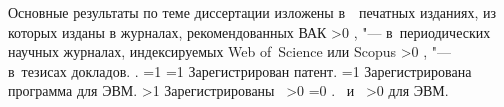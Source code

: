{\begin{refsection}
        \nocite{*}%
        {\publications} Основные результаты по теме диссертации изложены в~~печатных изданиях,
         из которых изданы в журналах, рекомендованных ВАК\sloppy%
        \ifnum \value{citeauthorscopuswos}>0%
            ,  "--- в~периодических научных журналах, индексируемых Web of~Science или Scopus\sloppy%
        \fi%
        \ifnum \value{citeauthorconf}>0%
            ,  "--- в~тезисах докладов.
        \else%
            .
        \fi%
        \ifnum \value{citeregistered}=1%
            \ifnum \value{citeauthorpatent}=1%
                Зарегистрирован  патент.
            \fi%
            \ifnum \value{citeauthorprogram}=1%
                Зарегистрирована  программа для ЭВМ.
            \fi%
        \fi%
        \ifnum \value{citeregistered}>1%
            Зарегистрированы\ %
            \ifnum \value{citeauthorpatent}>0%
            \sloppy%
            \ifnum \value{citeauthorprogram}=0 . \else \ и~\fi%
            \fi%
            \ifnum \value{citeauthorprogram}>0%
             для ЭВМ.
            \fi%
        \fi%
    \end{refsection}%
    \begin{refsection}
    \end{refsection}%
}

